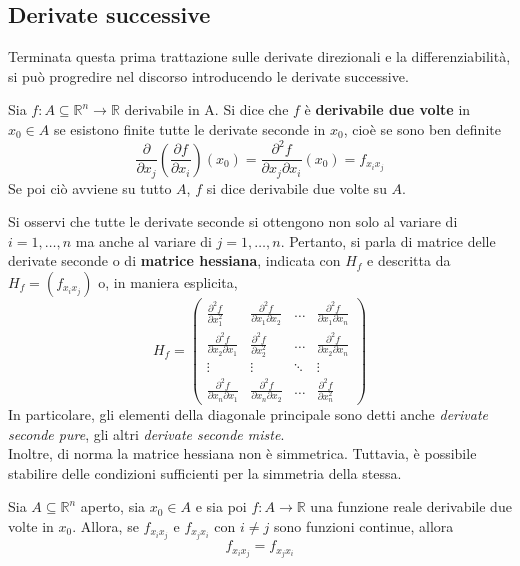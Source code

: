 \subsection{Derivate successive}
Terminata questa prima trattazione sulle derivate direzionali e la differenziabilità, si può progredire nel discorso introducendo le derivate successive.\\
\begin{definition}
    Sia $f:A \subseteq \mathbb{R}^n \to \mathbb{R}$ derivabile in A. Si dice che $f$ è \textbf{derivabile due volte} in $x_0 \in A$ se esistono finite tutte le derivate seconde in $x_0$, cioè se sono ben definite
    \begin{equation*}
        \frac{\partial}{\partial x_j}\left(\frac{\partial f}{\partial x_i}\right)(x_0)=\frac{\partial^2f}{\partial x_j \partial x_i}(x_0)=f_{x_ix_j}
    \end{equation*}
    Se poi ciò avviene su tutto $A$, $f$ si dice derivabile due volte su $A$.
\end{definition}
Si osservi che tutte le derivate seconde si ottengono non solo al variare di $i=1, \dots, n$ ma anche al variare di $j=1, \dots, n$. Pertanto, si parla di matrice delle derivate seconde o di \textbf{matrice hessiana}, indicata con $H_f$ e descritta da $H_f=(f_{x_ix_j})$ o, in maniera esplicita,
\begin{equation} \label{Eq: Matrice hessiana}
   H_f = \begin{pmatrix}
    \frac{\partial^2 f}{\partial x_1^2} & \frac{\partial^2 f}{\partial x_1 \partial x_2} & \dots  & \frac{\partial^2 f}{\partial x_1 \partial x_n} \\
    \frac{\partial^2 f}{\partial x_2 \partial x_1} & \frac{\partial^2 f}{\partial x_2^2}  & \dots  & \frac{\partial^2 f}{\partial x_2 \partial x_n} \\
    \vdots & \vdots & \ddots & \vdots \\
    \frac{\partial^2 f}{\partial x_n \partial x_1} & \frac{\partial^2 f}{\partial x_n \partial x_2} & \dots  & \frac{\partial^2 f}{\partial x_n^2}
    \end{pmatrix}
\end{equation}
In particolare, gli elementi della diagonale principale sono detti anche \textit{derivate seconde pure}, gli altri \textit{derivate seconde miste}.\\
Inoltre, di norma la matrice hessiana non è simmetrica. Tuttavia, è possibile stabilire delle condizioni sufficienti per la simmetria della stessa.
\begin{theorem} \label{Teo: Schwarz}
    Sia $A \subseteq \mathbb{R}^n$ aperto, sia $x_0 \in A$ e sia poi $f: A \to \mathbb{R}$ una funzione reale derivabile due volte in $x_0$. Allora, se $f_{x_ix_j}$ e $f_{x_jx_i}$ con $i \neq j$ sono funzioni continue, allora 
    \begin{equation*}
        f_{x_ix_j}=f_{x_jx_i}
    \end{equation*}
\end{theorem}
